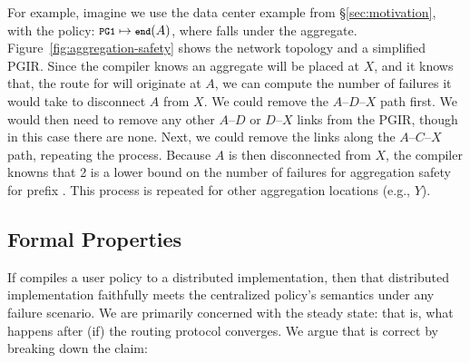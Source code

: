 For example, imagine we use the data center example from \S\ref{sec:motivation}, with the policy: 
$\CD{PG1} \mapsto \End(A)$, where  falls under the  aggregate. Figure~\ref{fig:aggregation-safety} shows the network topology and a simplified PGIR. Since the compiler knows an aggregate will be placed at $X$, and it knows that, the route for  will originate at $A$, we can compute the number of failures it would take to disconnect $A$ from $X$. We could remove the $A$--$D$--$X$ path first. We would then need to remove any other $A$--$D$ or $D$--$X$ links from the PGIR, though in this case there are none. Next, we could remove the links along the $A$--$C$--$X$ path, repeating the process. Because $A$ is then disconnected from $X$, the compiler knowns that 2 is a lower bound on the number of failures for aggregation safety for prefix . This process is repeated for other aggregation locations (e.g., $Y$).

\subsection{Formal Properties}

\newtheorem{prop}{Proposition}[section]


If \sysname compiles a user policy to a distributed implementation, then that distributed implementation faithfully meets the centralized policy's semantics under any failure scenario. We are primarily concerned with the steady state: that is, what happens after (if) the routing protocol converges. We argue that \sysname is correct by breaking down the claim:

